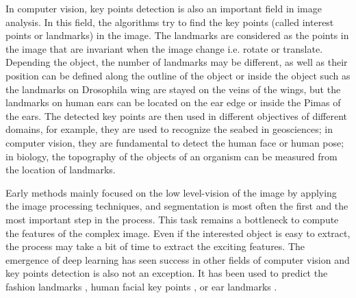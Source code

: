 \documentclass[review]{elsarticle}
\begin{document}
In computer vision, key points detection is also an important field in image analysis. In this field, the algorithms try to find the key points (called interest points or landmarks) in the image. The landmarks are considered as the points in the image that are invariant when the image change i.e. rotate or translate. Depending the object, the number of landmarks may be different, as well as their position can be defined along the outline of the object or inside the object such as the landmarks on Drosophila wing \cite{palaniswamy2010automatic} are stayed on the veins of the wings, but the landmarks on human ears \cite{cintas2016automatic} can be located on the ear edge or inside the Pimas of the ears. The detected key points are then used in different objectives of different domains, for example, they are used to recognize the seabed in geosciences; in computer vision, they are fundamental to detect the human face or human pose; in biology, the topography of the objects of an organism can be measured from the location of landmarks.
 

Early methods \cite{lowe2004distinctive,bay2006surf,palaniswamy2010automatic} mainly focused on the low level-vision of the image by applying the image processing techniques, and segmentation is most often the first and the most important step in the process. This task remains a bottleneck to compute the features of the complex image. Even if the interested object is easy to extract, the process may take a bit of time to extract the exciting features. The emergence of deep learning has seen success in other fields of computer vision and key points detection is also not an exception. It has been used to predict the fashion landmarks \cite{liu2016fashion}, human facial key points \cite{sun2013deep,zhang2014facial}, or ear landmarks \cite{cintas2016automatic}.
\end{document}
